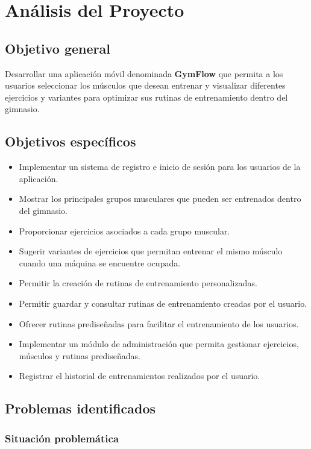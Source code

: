 \section{Análisis del Proyecto}

\subsection{Objetivo general}

Desarrollar una aplicación móvil denominada \textbf{GymFlow} que permita a los usuarios seleccionar los músculos que desean entrenar y visualizar diferentes ejercicios y variantes para optimizar sus rutinas de entrenamiento dentro del gimnasio.

\subsection{Objetivos específicos}

\begin{itemize}
    \item Implementar un sistema de registro e inicio de sesión para los usuarios de la aplicación.
    \item Mostrar los principales grupos musculares que pueden ser entrenados dentro del gimnasio.
    \item Proporcionar ejercicios asociados a cada grupo muscular.
    \item Sugerir variantes de ejercicios que permitan entrenar el mismo músculo cuando una máquina se encuentre ocupada.
    \item Permitir la creación de rutinas de entrenamiento personalizadas.
    \item Permitir guardar y consultar rutinas de entrenamiento creadas por el usuario.
    \item Ofrecer rutinas prediseñadas para facilitar el entrenamiento de los usuarios.
    \item Implementar un módulo de administración que permita gestionar ejercicios, músculos y rutinas prediseñadas.
    \item Registrar el historial de entrenamientos realizados por el usuario.
\end{itemize}

\subsection{Problemas identificados}

\subsubsection{Situación problemática}

